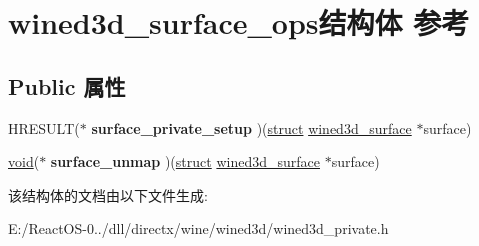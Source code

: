 \hypertarget{structwined3d__surface__ops}{}\section{wined3d\+\_\+surface\+\_\+ops结构体 参考}
\label{structwined3d__surface__ops}
\subsection*{Public 属性}
\begin{DoxyCompactItemize}
\item 
\mbox{\label{structwined3d__surface__ops_ac69f77998755d76bd0468a6fc004e4c1}} 
H\+R\+E\+S\+U\+LT($\ast$ {\bfseries surface\+\_\+private\+\_\+setup} )(\hyperlink{interfacestruct}{struct} \hyperlink{structwined3d__surface}{wined3d\+\_\+surface} $\ast$surface)
\item 
\mbox{\label{structwined3d__surface__ops_a618e639a81605f56ac94a6413afbe5ca}} 
\hyperlink{interfacevoid}{void}($\ast$ {\bfseries surface\+\_\+unmap} )(\hyperlink{interfacestruct}{struct} \hyperlink{structwined3d__surface}{wined3d\+\_\+surface} $\ast$surface)
\end{DoxyCompactItemize}


该结构体的文档由以下文件生成\+:\begin{DoxyCompactItemize}
\item 
E\+:/\+React\+O\+S-\/0../dll/directx/wine/wined3d/wined3d\+\_\+private.\+h\end{DoxyCompactItemize}
